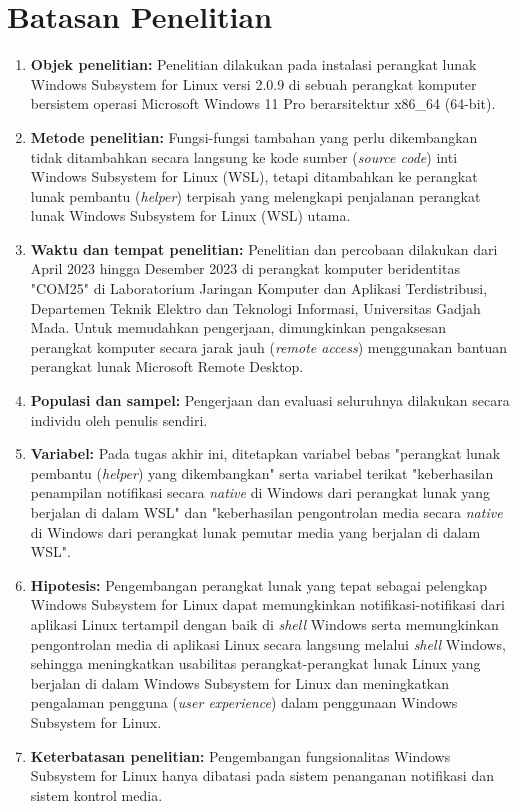 
\section{Batasan Penelitian}

\begin{enumerate}
    \item \textbf{Objek penelitian:} Penelitian dilakukan pada instalasi perangkat lunak Windows Subsystem for Linux versi 2.0.9 di sebuah perangkat komputer bersistem operasi Microsoft Windows 11 Pro berarsitektur x86\_64 (64-bit).
    
    \item \textbf{Metode penelitian:} Fungsi-fungsi tambahan yang perlu dikembangkan tidak ditambahkan secara langsung ke kode sumber (\textit{source code}) inti Windows Subsystem for Linux (WSL), tetapi ditambahkan ke perangkat lunak pembantu (\textit{helper}) terpisah yang melengkapi penjalanan perangkat lunak Windows Subsystem for Linux (WSL) utama.
    
    \item \textbf{Waktu dan tempat penelitian:} Penelitian dan percobaan dilakukan dari April 2023 hingga Desember 2023 di perangkat komputer beridentitas "COM25" di Laboratorium Jaringan Komputer dan Aplikasi Terdistribusi, Departemen Teknik Elektro dan Teknologi Informasi, Universitas Gadjah Mada. Untuk memudahkan pengerjaan, dimungkinkan pengaksesan perangkat komputer secara jarak jauh (\textit{remote access}) menggunakan bantuan perangkat lunak Microsoft Remote Desktop.
    
    \item \textbf{Populasi dan sampel:} Pengerjaan dan evaluasi seluruhnya dilakukan secara individu oleh penulis sendiri.
    
    \item \textbf{Variabel:} Pada tugas akhir ini, ditetapkan variabel bebas "perangkat lunak pembantu (\textit{helper}) yang dikembangkan" serta variabel terikat "keberhasilan penampilan notifikasi secara \textit{native} di Windows dari perangkat lunak yang berjalan di dalam WSL" dan "keberhasilan pengontrolan media secara \textit{native} di Windows dari perangkat lunak pemutar media yang berjalan di dalam WSL".
    
    \item \textbf{Hipotesis:} Pengembangan perangkat lunak yang tepat sebagai pelengkap Windows Subsystem for Linux dapat memungkinkan notifikasi-notifikasi dari aplikasi Linux tertampil dengan baik di \textit{shell} Windows serta memungkinkan pengontrolan media di aplikasi Linux secara langsung melalui \textit{shell} Windows, sehingga meningkatkan usabilitas perangkat-perangkat lunak Linux yang berjalan di dalam Windows Subsystem for Linux dan meningkatkan pengalaman pengguna (\textit{user experience}) dalam penggunaan Windows Subsystem for Linux.
        
    \item \textbf{Keterbatasan penelitian:} Pengembangan fungsionalitas Windows Subsystem for Linux hanya dibatasi pada sistem penanganan notifikasi dan sistem kontrol media.
\end{enumerate}

